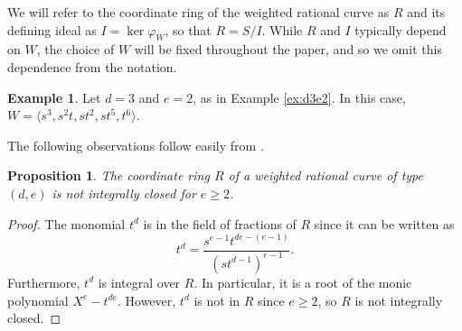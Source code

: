 \documentclass[12pt,reqno]{amsart}
\newtheorem{proposition}[theorem]{Proposition}
\theoremstyle{definition}
\newtheorem{example}[theorem]{Example}
\theoremstyle{remark}
\newcommand{\bbk}{\mathbbm{k}}
\newcommand{\ideal}[1]{{\langle #1 \rangle}}
\begin{document}
We will refer to the coordinate ring of the weighted rational curve as $R$ and its defining ideal as $I = \ker \varphi_W$, so that $R = S/I$. While $R$ and $I$ typically depend on $W$, the choice of $W$ will be fixed throughout the paper, and so we omit this dependence from the notation.

\begin{example}
Let $d=3$ and $e=2$, as in Example \ref{ex:d3e2}. In this case, $W = \langle s^3, s^2t, st^2, st^5, t^6 \rangle$.
\end{example}

The following observations follow easily from \cite{beLinSyzOCurvesIWProjSp}. 

\begin{proposition}
\label{prop:notnormal}
\cite[Remark~3.15]{beLinSyzOCurvesIWProjSp}  The coordinate ring $R$ of a weighted rational curve of type $(d,e)$ is not integrally closed for $e\geq 2$.
\end{proposition}

\begin{proof}
The monomial $t^d$ is in the field of fractions of $R$ since it can be written as 
\[
t^d = \frac{s^{e-1}t^{de - (e-1)}}{(st^{d-1})^{e-1}}.
\]
Furthermore, $t^d$ is integral over $R$.  In particular, it is a root of the monic polynomial $X^e-t^{de}$.  However, $t^d$ is not in $R$ since $e \geq 2$, so $R$ is not integrally closed.
\end{proof}
\end{document}
